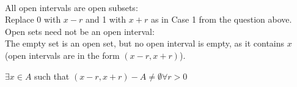 \begin{solution}
 \\All open intervals are open subsets: \\
 Replace 0 with $x-r$ and 1 with $x+r$ as in Case 1 from the question above. \\
 Open sets need not be an open interval: \\
 The empty set is an open set, but no open interval is empty, as it contains $x$ (open intervals are in the form $(x-r,x+r)$).
\end{solution}


\begin{solution}
 $\exists x \in A$ such that $(x-r,x+r)-A \neq \emptyset \forall r > 0$
\end{solution}


